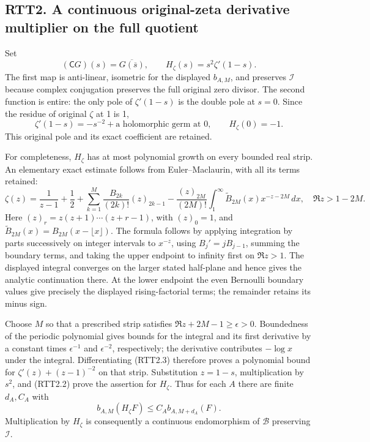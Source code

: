 \subsection{RTT2. A continuous original-zeta derivative multiplier on
the full
quotient}\label{rtt2.-a-continuous-original-zeta-derivative-multiplier-on-the-full-quotient}

Set \[
(\mathsf C G)(s)=\overline{G(\overline s)},\qquad
H_\zeta(s)=s^2\zeta'(1-s).
\tag{RTT2.1}
\] The first map is anti-linear, isometric for the displayed
\(b_{A,M}\), and preserves \(\mathcal I\) because complex conjugation
preserves the full original zero divisor. The second function is entire:
the only pole of \(\zeta'(1-s)\) is the double pole at \(s=0\). Since
the residue of original \(\zeta\) at 1 is 1, \[
\zeta'(1-s)=-s^{-2}+\text{a holomorphic germ at }0,
\qquad H_\zeta(0)=-1.
\tag{RTT2.2}
\] This original pole and its exact coefficient are retained.

For completeness, \(H_\zeta\) has at most polynomial growth on every
bounded real strip. An elementary exact estimate follows from
Euler--Maclaurin, with all its terms retained: \[
\zeta(z)=\frac1{z-1}+\frac12+
\sum_{k=1}^{M}\frac{B_{2k}}{(2k)!}(z)_{2k-1}
-\frac{(z)_{2M}}{(2M)!}
\int_1^\infty\widetilde B_{2M}(x)x^{-z-2M}\,dx,
\quad \Re z>1-2M.
\tag{RTT2.3}
\] Here \((z)_r=z(z+1)\cdots(z+r-1)\), with \((z)_0=1\), and
\(\widetilde B_{2M}(x)=B_{2M}(x-\lfloor x\rfloor)\). The formula follows
by applying integration by parts successively on integer intervals to
\(x^{-z}\), using \(B_j'=jB_{j-1}\), summing the boundary terms, and
taking the upper endpoint to infinity first on \(\Re z>1\). The
displayed integral converges on the larger stated half-plane and hence
gives the analytic continuation there. At the lower endpoint the even
Bernoulli boundary values give precisely the displayed rising-factorial
terms; the remainder retains its minus sign.

Choose \(M\) so that a prescribed strip satisfies
\(\Re z+2M-1\ge\epsilon>0\). Boundedness of the periodic polynomial
gives bounds for the integral and its first derivative by a constant
times \(\epsilon^{-1}\) and \(\epsilon^{-2}\), respectively; the
derivative contributes \(-\log x\) under the integral. Differentiating
(RTT2.3) therefore proves a polynomial bound for
\(\zeta'(z)+(z-1)^{-2}\) on that strip. Substitution \(z=1-s\),
multiplication by \(s^2\), and (RTT2.2) prove the assertion for
\(H_\zeta\). Thus for each \(A\) there are finite \(d_A,C_A\) with \[
b_{A,M}(H_\zeta F)\le C_A b_{A,M+d_A}(F).
\tag{RTT2.4}
\] Multiplication by \(H_\zeta\) is consequently a continuous
endomorphism of \(\mathcal B\) preserving \(\mathcal I\).

